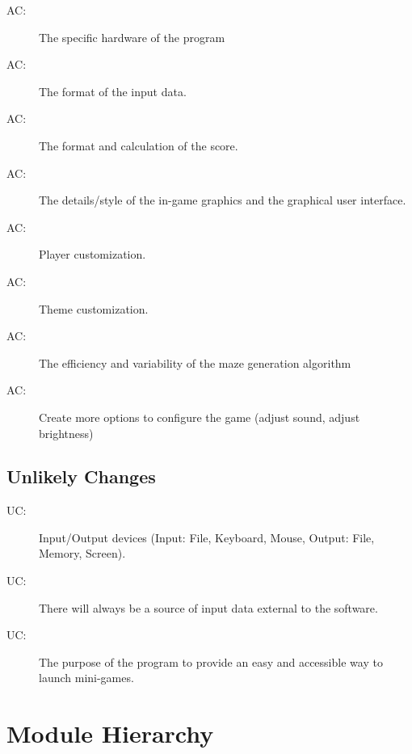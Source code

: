 \documentclass[12pt, titlepage]{article}
\newcounter{acnum}
\newcommand{\actheacnum}{AC\theacnum}
\newcounter{ucnum}
\newcommand{\uctheucnum}{UC\theucnum}
\begin{document}
\begin{description}
\item[ \actheacnum \label{acHH}:] The specific hardware of the program
\item[ \actheacnum \label{acInput}:] The format of the input data.
\item[ \actheacnum \label{acScore}:] The format and calculation of the score.
\item[ \actheacnum \label{acGraphics}:] The details/style of the in-game graphics and the graphical user interface.
\item[ \actheacnum \label{acCharacter}:] Player customization.
\item[ \actheacnum \label{acTheme}:] Theme customization.
\item[ \actheacnum \label{acMazeAlg}:] The efficiency and variability of the maze generation algorithm
\item[ \actheacnum \label{acSettings}:] Create more options to configure the game (adjust sound, adjust brightness)
\end{description}

\subsection{Unlikely Changes} \label{SecUchange}

\begin{description}
\item[ \uctheucnum \label{ucIO}:] Input/Output devices (Input: File, Keyboard, Mouse, Output: File, Memory, Screen).
\item[ \uctheucnum \label{ucInput}:] There will always be a source of input data external to the software.
\item[ \uctheucnum \label{ucPurpose}:] The purpose of the program to provide an easy and accessible way to launch mini-games.
\end{description}

\section{Module Hierarchy} \label{SecMH}
\end{document}
